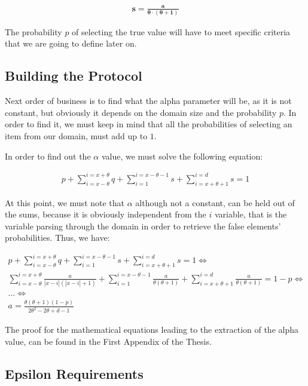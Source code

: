 \begin{align}
    \mathbf{s = \frac{a}{\theta \cdot (\theta + 1)}}
\end{align}

The probability $p$ of selecting the true value will have to meet specific criteria that we are going to define later on.

\subsection{Building the Protocol}
Next order of business is to find what the alpha parameter will be, as it is not constant, but obviously it depends on the domain size and the probability $p$. In order to find it, we must keep in mind that all the probabilities of selecting an item from our domain, must add up to $1$.

In order to find out the $\alpha$ value, we must solve the following equation:

\begin{align*}
    p + \sum_{i = x - \theta}^{i = x + \theta} q + \sum_{i = 1}^{i = x - \theta -1} s + \sum_{i = x + \theta + 1}^{i = d} s = 1
\end{align*}

At this point, we must note that $\alpha$ although not a constant, can be held out of the sums, because it is obviously independent from the $i$ variable, that is the variable parsing through the domain in order to retrieve the false elements' probabilities. Thus, we have:

\begin{align*}
        p + \sum_{i = x - \theta}^{i = x + \theta} q + \sum_{i = 1}^{i = x - \theta -1} s + \sum_{i = x + \theta + 1}^{i = d} s = 1 \Longleftrightarrow \\
      \sum_{i = x - \theta}^{i = x + \theta} \frac{a}{|x-i|(|x-i| + 1)} + \sum_{i = 1}^{i = x - \theta -1} \frac{a}{\theta(\theta+1)} + \sum_{i = x + \theta + 1}^{i = d} \frac{a}{\theta(\theta+1)} = 1 - p \Longleftrightarrow \\ \dots \Longleftrightarrow \\ 
    a = \frac{\theta(\theta + 1) (1 - p)}{2\theta^2 - 2\theta + d - 1}
\end{align*}

The proof for the mathematical equations leading to the extraction of the alpha value, can be found in the First Appendix of the Thesis.

\subsection{Epsilon Requirements}

